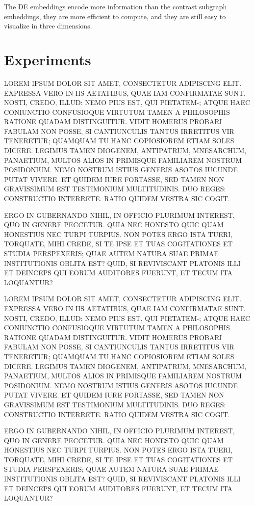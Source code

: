\documentclass[letterpaper]{article}
\begin{document}
The DE embeddings encode more information than the contrast subgraph embeddings, they are more efficient to compute, and they are still easy to visualize in three dimensions.



\section{Experiments}
LOREM IPSUM DOLOR SIT AMET, CONSECTETUR ADIPISCING ELIT. EXPRESSA VERO IN IIS AETATIBUS, QUAE IAM CONFIRMATAE SUNT. NOSTI, CREDO, ILLUD: NEMO PIUS EST, QUI PIETATEM-; ATQUE HAEC CONIUNCTIO CONFUSIOQUE VIRTUTUM TAMEN A PHILOSOPHIS RATIONE QUADAM DISTINGUITUR. VIDIT HOMERUS PROBARI FABULAM NON POSSE, SI CANTIUNCULIS TANTUS IRRETITUS VIR TENERETUR; QUAMQUAM TU HANC COPIOSIOREM ETIAM SOLES DICERE. LEGIMUS TAMEN DIOGENEM, ANTIPATRUM, MNESARCHUM, PANAETIUM, MULTOS ALIOS IN PRIMISQUE FAMILIAREM NOSTRUM POSIDONIUM. NEMO NOSTRUM ISTIUS GENERIS ASOTOS IUCUNDE PUTAT VIVERE. ET QUIDEM IURE FORTASSE, SED TAMEN NON GRAVISSIMUM EST TESTIMONIUM MULTITUDINIS. DUO REGES: CONSTRUCTIO INTERRETE. RATIO QUIDEM VESTRA SIC COGIT.

ERGO IN GUBERNANDO NIHIL, IN OFFICIO PLURIMUM INTEREST, QUO IN GENERE PECCETUR. QUIA NEC HONESTO QUIC QUAM HONESTIUS NEC TURPI TURPIUS. NON POTES ERGO ISTA TUERI, TORQUATE, MIHI CREDE, SI TE IPSE ET TUAS COGITATIONES ET STUDIA PERSPEXERIS; QUAE AUTEM NATURA SUAE PRIMAE INSTITUTIONIS OBLITA EST? QUID, SI REVIVISCANT PLATONIS ILLI ET DEINCEPS QUI EORUM AUDITORES FUERUNT, ET TECUM ITA LOQUANTUR?

LOREM IPSUM DOLOR SIT AMET, CONSECTETUR ADIPISCING ELIT. EXPRESSA VERO IN IIS AETATIBUS, QUAE IAM CONFIRMATAE SUNT. NOSTI, CREDO, ILLUD: NEMO PIUS EST, QUI PIETATEM-; ATQUE HAEC CONIUNCTIO CONFUSIOQUE VIRTUTUM TAMEN A PHILOSOPHIS RATIONE QUADAM DISTINGUITUR. VIDIT HOMERUS PROBARI FABULAM NON POSSE, SI CANTIUNCULIS TANTUS IRRETITUS VIR TENERETUR; QUAMQUAM TU HANC COPIOSIOREM ETIAM SOLES DICERE. LEGIMUS TAMEN DIOGENEM, ANTIPATRUM, MNESARCHUM, PANAETIUM, MULTOS ALIOS IN PRIMISQUE FAMILIAREM NOSTRUM POSIDONIUM. NEMO NOSTRUM ISTIUS GENERIS ASOTOS IUCUNDE PUTAT VIVERE. ET QUIDEM IURE FORTASSE, SED TAMEN NON GRAVISSIMUM EST TESTIMONIUM MULTITUDINIS. DUO REGES: CONSTRUCTIO INTERRETE. RATIO QUIDEM VESTRA SIC COGIT.

ERGO IN GUBERNANDO NIHIL, IN OFFICIO PLURIMUM INTEREST, QUO IN GENERE PECCETUR. QUIA NEC HONESTO QUIC QUAM HONESTIUS NEC TURPI TURPIUS. NON POTES ERGO ISTA TUERI, TORQUATE, MIHI CREDE, SI TE IPSE ET TUAS COGITATIONES ET STUDIA PERSPEXERIS; QUAE AUTEM NATURA SUAE PRIMAE INSTITUTIONIS OBLITA EST? QUID, SI REVIVISCANT PLATONIS ILLI ET DEINCEPS QUI EORUM AUDITORES FUERUNT, ET TECUM ITA LOQUANTUR?
\end{document}

